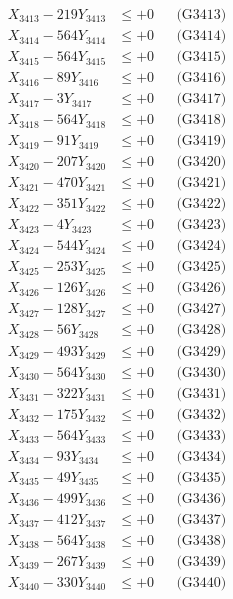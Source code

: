 \documentclass[a4paper,10pt]{article}
\begin{document}
{\begin{align}
X_{3413} - 219Y_{3413} &\leq +0 && \text{(G3413)} \\
X_{3414} - 564Y_{3414} &\leq +0 && \text{(G3414)} \\
X_{3415} - 564Y_{3415} &\leq +0 && \text{(G3415)} \\
X_{3416} - 89Y_{3416} &\leq +0 && \text{(G3416)} \\
X_{3417} - 3Y_{3417} &\leq +0 && \text{(G3417)} \\
X_{3418} - 564Y_{3418} &\leq +0 && \text{(G3418)} \\
X_{3419} - 91Y_{3419} &\leq +0 && \text{(G3419)} \\
X_{3420} - 207Y_{3420} &\leq +0 && \text{(G3420)} \\
\allowbreak
X_{3421} - 470Y_{3421} &\leq +0 && \text{(G3421)} \\
X_{3422} - 351Y_{3422} &\leq +0 && \text{(G3422)} \\
X_{3423} - 4Y_{3423} &\leq +0 && \text{(G3423)} \\
X_{3424} - 544Y_{3424} &\leq +0 && \text{(G3424)} \\
X_{3425} - 253Y_{3425} &\leq +0 && \text{(G3425)} \\
X_{3426} - 126Y_{3426} &\leq +0 && \text{(G3426)} \\
X_{3427} - 128Y_{3427} &\leq +0 && \text{(G3427)} \\
X_{3428} - 56Y_{3428} &\leq +0 && \text{(G3428)} \\
X_{3429} - 493Y_{3429} &\leq +0 && \text{(G3429)} \\
X_{3430} - 564Y_{3430} &\leq +0 && \text{(G3430)} \\
\allowbreak
X_{3431} - 322Y_{3431} &\leq +0 && \text{(G3431)} \\
X_{3432} - 175Y_{3432} &\leq +0 && \text{(G3432)} \\
X_{3433} - 564Y_{3433} &\leq +0 && \text{(G3433)} \\
X_{3434} - 93Y_{3434} &\leq +0 && \text{(G3434)} \\
X_{3435} - 49Y_{3435} &\leq +0 && \text{(G3435)} \\
X_{3436} - 499Y_{3436} &\leq +0 && \text{(G3436)} \\
X_{3437} - 412Y_{3437} &\leq +0 && \text{(G3437)} \\
X_{3438} - 564Y_{3438} &\leq +0 && \text{(G3438)} \\
X_{3439} - 267Y_{3439} &\leq +0 && \text{(G3439)} \\
X_{3440} - 330Y_{3440} &\leq +0 && \text{(G3440)} \\

\end{align}}
\end{document}
